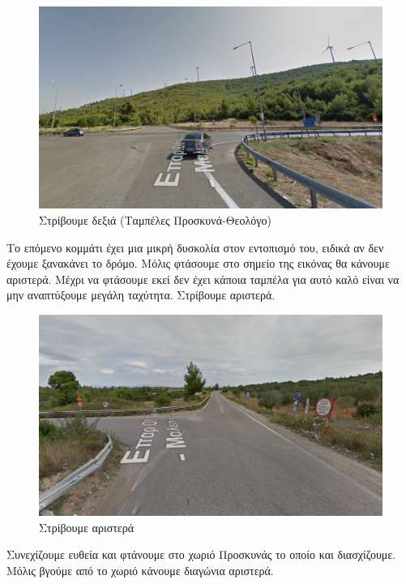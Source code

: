 \begin{figure}[hbp!]
	\centering
		\includegraphics[width=\textwidth]{images/athina-lamia/tragana/tragana3.PNG}
			\caption{Στρίβουμε δεξιά (Ταμπέλες Προσκυνά-Θεολόγο)}
\end{figure}
Το επόμενο κομμάτι έχει μια μικρή δυσκολία στον εντοπισμό του, ειδικά αν δεν έχουμε ξανακάνει το δρόμο. Μόλις φτάσουμε στο σημείο της εικόνας θα κάνουμε αριστερά. Μέχρι να φτάσουμε εκεί δεν έχει κάποια ταμπέλα για αυτό καλό είναι να μην αναπτύξουμε μεγάλη ταχύτητα. Στρίβουμε αριστερά.
\begin{figure}[hbp!]
	\centering
		\includegraphics[width=\textwidth]{images/athina-lamia/tragana/tragana4.PNG}
			\caption{Στρίβουμε αριστερά}
\end{figure}
\newpage
Συνεχίζουμε ευθεία και φτάνουμε στο χωριό Προσκυνάς το οποίο και διασχίζουμε. Μόλις βγούμε από το χωριό κάνουμε διαγώνια αριστερά.
